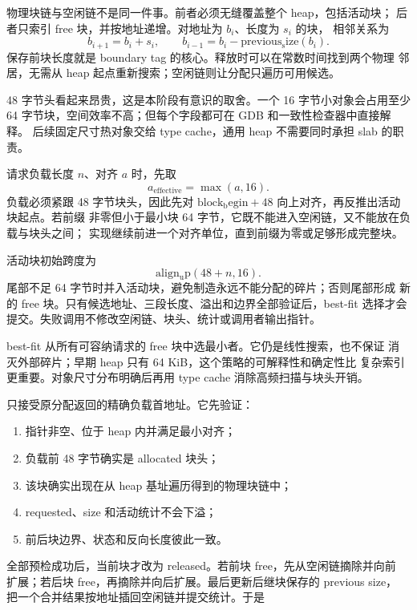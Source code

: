物理块链与空闲链不是同一件事。前者必须无缝覆盖整个 heap，包括活动块；
后者只索引 free 块，并按地址递增。对地址为 \(b_i\)、长度为 \(s_i\) 的块，
相邻关系为
\[
  b_{i+1}=b_i+s_i,\qquad
  b_{i-1}=b_i-\operatorname{previous_size}(b_i).
\]
保存前块长度就是 boundary tag 的核心。释放时可以在常数时间找到两个物理
邻居，无需从 heap 起点重新搜索；空闲链则让分配只遍历可用候选。

48 字节头看起来昂贵，这是本阶段有意识的取舍。一个 16 字节小对象会占用至少
64 字节块，空间效率不高；但每个字段都可在 GDB 和一致性检查器中直接解释。
后续固定尺寸热对象交给 type cache，通用 heap 不需要同时承担 slab 的职责。

请求负载长度 \(n\)、对齐 \(a\) 时，先取
\[
  a_{\mathrm{effective}}=\max(a,16).
\]
负载必须紧跟 48 字节块头，因此先对
\(\operatorname{block_begin}+48\) 向上对齐，再反推出活动块起点。若前缀
非零但小于最小块 64 字节，它既不能进入空闲链，又不能放在负载与块头之间；
实现继续前进一个对齐单位，直到前缀为零或足够形成完整块。

活动块初始跨度为
\[
  \operatorname{align_up}(48+n,16).
\]
尾部不足 64 字节时并入活动块，避免制造永远不能分配的碎片；否则尾部形成
新的 free 块。只有候选地址、三段长度、溢出和边界全部验证后，best-fit
选择才会提交。失败调用不修改空闲链、块头、统计或调用者输出指针。

best-fit 从所有可容纳请求的 free 块中选最小者。它仍是线性搜索，也不保证
消灭外部碎片；早期 heap 只有 64 KiB，这个策略的可解释性和确定性比
复杂索引更重要。对象尺寸分布明确后再用 type cache 消除高频扫描与块头开销。

 只接受原分配返回的精确负载首地址。它先验证：

\begin{enumerate}[label=\arabic*.]
  \item 指针非空、位于 heap 内并满足最小对齐；
  \item 负载前 48 字节确实是 allocated 块头；
  \item 该块确实出现在从 heap 基址遍历得到的物理块链中；
  \item requested、size 和活动统计不会下溢；
  \item 前后块边界、状态和反向长度彼此一致。
\end{enumerate}

全部预检成功后，当前块才改为 released。若前块 free，先从空闲链摘除并向前
扩展；若后块 free，再摘除并向后扩展。最后更新后继块保存的 previous size，
把一个合并结果按地址插回空闲链并提交统计。于是

